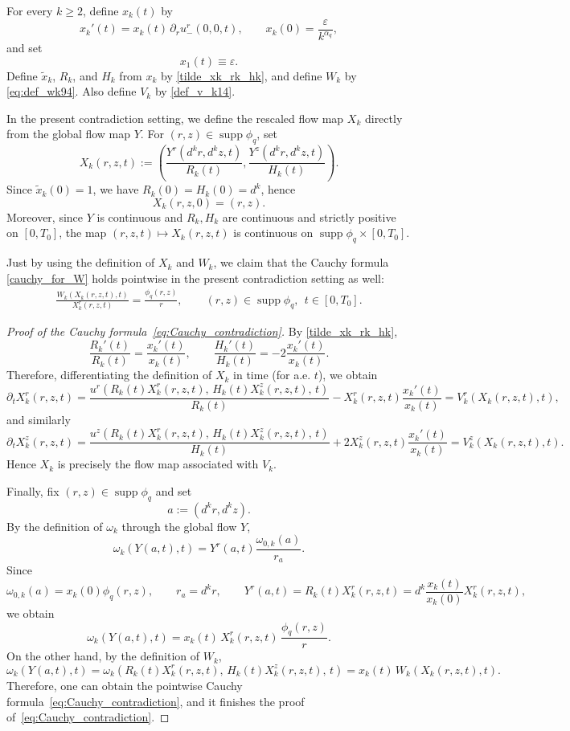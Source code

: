 \documentclass[reqno,11pt]{amsart}
\newcommand{\supp}{\operatorname{supp}}
\begin{document}
For every $k\ge 2$, define $x_k(t)$ by
\[
x_k'(t)=x_k(t)\,\partial_r u_-^r(0,0,t),
\qquad
x_k(0)=\frac{\varepsilon}{k^{\alpha_q}},
\]
and set
\[
x_1(t)\equiv \varepsilon.
\]
Define $\tilde x_k$, $R_k$, and $H_k$ from $x_k$ by \eqref{tilde_xk_rk_hk}, and define
$W_k$ by \eqref{eq:def_wk94}. Also define $V_k$ by \eqref{def_v_k14}.

In the present contradiction setting, we define the rescaled flow map $X_k$ directly from
the global flow map $Y$. For $(r,z)\in \supp \phi_q$, set
\[
X_k(r,z,t):=
\left(
\frac{Y^r(d^k r,d^k z,t)}{R_k(t)},
\frac{Y^z(d^k r,d^k z,t)}{H_k(t)}
\right).
\]
Since $\tilde x_k(0)=1$, we have $R_k(0)=H_k(0)=d^k$, hence
\[
X_k(r,z,0)=(r,z).
\]
Moreover, since $Y$ is continuous and $R_k,H_k$ are continuous and strictly positive on
$[0,T_0]$, the map $(r,z,t)\mapsto X_k(r,z,t)$ is continuous on
$\supp \phi_q\times [0,T_0]$.

Just by using the definition of $X_k$ and $W_k$, we claim that the Cauchy formula \eqref{cauchy_for_W} holds pointwise in the present contradiction setting as well:
\begin{align}
\label{eq:Cauchy_contradiction}
\frac{W_k(X_k(r,z,t),t)}{X_k^r(r,z,t)}
=
\frac{\phi_q(r,z)}{r},
\qquad
(r,z)\in \supp \phi_q,\ \ t\in[0,T_0].
\end{align}

\begin{proof}[Proof of the Cauchy formula~\eqref{eq:Cauchy_contradiction}]
By \eqref{tilde_xk_rk_hk},
\[
\frac{R_k'(t)}{R_k(t)}=\frac{x_k'(t)}{x_k(t)},
\qquad
\frac{H_k'(t)}{H_k(t)}=-2\frac{x_k'(t)}{x_k(t)}.
\]
Therefore, differentiating the definition of $X_k$ in time (for a.e. $t$), we obtain
\[
\partial_t X_k^r(r,z,t)
=
\frac{u^r(R_k(t)X_k^r(r,z,t),\,H_k(t)X_k^z(r,z,t),\,t)}{R_k(t)}
-
X_k^r(r,z,t)\frac{x_k'(t)}{x_k(t)}
=
V_k^r(X_k(r,z,t),t),
\]
and similarly
\[
\partial_t X_k^z(r,z,t)
=
\frac{u^z(R_k(t)X_k^r(r,z,t),\,H_k(t)X_k^z(r,z,t),\,t)}{H_k(t)}
+
2X_k^z(r,z,t)\frac{x_k'(t)}{x_k(t)}
=
V_k^z(X_k(r,z,t),t).
\]
Hence $X_k$ is precisely the flow map associated with $V_k$.

Finally, fix $(r,z)\in \supp \phi_q$ and set
\[
a:=(d^k r,d^k z).
\]
By the definition of $\omega_k$ through the global flow $Y$,
\[
\omega_k(Y(a,t),t)
=
Y^r(a,t)\frac{\omega_{0,k}(a)}{r_a}.
\]
Since
\[
\omega_{0,k}(a)=x_k(0)\phi_q(r,z),
\qquad
r_a=d^k r,
\qquad
Y^r(a,t)=R_k(t)X_k^r(r,z,t)
=
d^k\frac{x_k(t)}{x_k(0)}X_k^r(r,z,t),
\]
we obtain
\[
\omega_k(Y(a,t),t)
=
x_k(t)\,X_k^r(r,z,t)\,\frac{\phi_q(r,z)}{r}.
\]
On the other hand, by the definition of $W_k$,
\[
\omega_k(Y(a,t),t)
=
\omega_k(R_k(t)X_k^r(r,z,t),\,H_k(t)X_k^z(r,z,t),\,t)
=
x_k(t)\,W_k(X_k(r,z,t),t).
\]
Therefore, one can obtain the pointwise Cauchy formula~\eqref{eq:Cauchy_contradiction}, and it finishes the proof of~\eqref{eq:Cauchy_contradiction}.
\end{proof}
\end{document}
